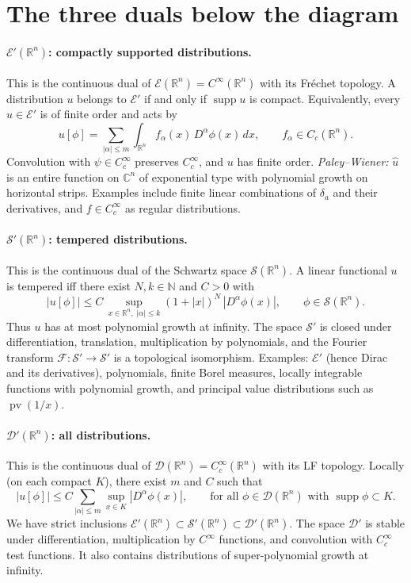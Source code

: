 \documentclass[12pt,a4paper]{article}
\theoremstyle{plain}
\theoremstyle{definition}
\theoremstyle{remark}
\theoremstyle{remark}
\begin{document}
\section*{The three duals below the diagram}

\paragraph{$\mathcal E'(\mathbb R^n)$: compactly supported distributions.}
This is the continuous dual of $\mathcal E(\mathbb R^n)=C^\infty(\mathbb R^n)$ with its Fr\'echet topology.
A distribution $u$ belongs to $\mathcal E'$ if and only if $\operatorname{supp}u$ is compact.
Equivalently, every $u\in\mathcal E'$ is of finite order and acts by
\[
u[\phi]=\sum_{|\alpha|\le m}\int_{\mathbb R^n} f_\alpha(x)\,D^\alpha\phi(x)\,dx,
\qquad f_\alpha\in C_c(\mathbb R^n).
\]
Convolution with $\psi\in C_c^\infty$ preserves $C_c^\infty$, and $u$ has finite order.
\emph{Paley--Wiener:} $\widehat{u}$ is an entire function on $\mathbb C^n$ of exponential type with polynomial growth on horizontal strips.
Examples include finite linear combinations of $\delta_a$ and their derivatives, and $f\in C_c^\infty$ as regular distributions.

\bigskip

\paragraph{$\mathcal S'(\mathbb R^n)$: tempered distributions.}
This is the continuous dual of the Schwartz space $\mathcal S(\mathbb R^n)$.
A linear functional $u$ is tempered iff there exist $N,k\in\mathbb N$ and $C>0$ with
\[
|u[\phi]|\le C\,\sup_{x\in\mathbb R^n,\;|\alpha|\le k}(1+|x|)^N\,|D^\alpha\phi(x)|,
\qquad \phi\in\mathcal S(\mathbb R^n).
\]
Thus $u$ has at most polynomial growth at infinity. The space $\mathcal S'$ is closed under differentiation, translation,
multiplication by polynomials, and the Fourier transform $\mathcal F:\mathcal S'\to\mathcal S'$ is a topological isomorphism.
Examples: $\mathcal E'$ (hence Dirac and its derivatives), polynomials, finite Borel measures,
locally integrable functions with polynomial growth, and principal value distributions such as $\operatorname{pv}(1/x)$.

\bigskip

\paragraph{$\mathcal D'(\mathbb R^n)$: all distributions.}
This is the continuous dual of $\mathcal D(\mathbb R^n)=C_c^\infty(\mathbb R^n)$ with its LF topology.
Locally (on each compact $K$), there exist $m$ and $C$ such that
\[
|u[\phi]|\le C\sum_{|\alpha|\le m}\sup_{x\in K}|D^\alpha\phi(x)|,
\qquad \text{for all }\phi\in\mathcal D(\mathbb R^n)\text{ with }\operatorname{supp}\phi\subset K.
\]
We have strict inclusions $\mathcal E'(\mathbb R^n)\subset \mathcal S'(\mathbb R^n)\subset \mathcal D'(\mathbb R^n)$.
The space $\mathcal D'$ is stable under differentiation, multiplication by $C^\infty$ functions,
and convolution with $C_c^\infty$ test functions.
It also contains distributions of super-polynomial growth at infinity.
\end{document}
